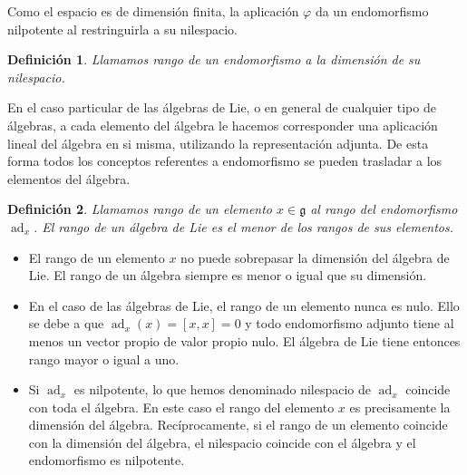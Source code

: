 \documentclass[a4paper,draft,12pt]{scrartcl}
\newtheorem{defi}{Definición}[section]%
\newcommand{\g}{\mathfrak{g}}%
\newcommand{\df}[1]{\textsf{\color{blue}#1}}
\DeclareMathOperator{\ad}{ad}  %
\begin{document}
Como el espacio es de dimensión finita, la aplicación $\varphi$ da un endomorfismo nilpotente al restringuirla a su nilespacio.

\begin{defi}

Llamamos  \df{rango} de un endomorfismo a la dimensión de su nilespacio.

\end{defi}

En el caso particular de las álgebras de Lie, o en general de cualquier tipo de álgebras, a cada elemento del álgebra le hacemos corresponder una aplicación lineal del álgebra en si misma, utilizando la representación adjunta.  De esta forma todos los conceptos referentes a endomorfismo se pueden trasladar a los elementos del álgebra.

\begin{defi}

Llamamos  \df{rango}  de un elemento $x \in \g$ al rango del endomorfismo $\ad_x$.  El  \df{rango} de un álgebra de Lie es el menor de los rangos de sus elementos.

\end{defi}



\begin{itemize}

\item  El rango de un elemento $x$ no puede sobrepasar la dimensión del álgebra de Lie.  El rango de un álgebra siempre es menor o igual que su dimensión.

\item  En el caso de las álgebras de Lie, el rango de un elemento nunca es nulo.  Ello se debe a que $\ad_x(x)= [x,x]=0$ y todo endomorfismo adjunto tiene al menos un vector propio de valor propio nulo.  El álgebra de Lie tiene entonces rango mayor o igual a uno.

\item  Si $\ad_x$ es nilpotente, lo que hemos denominado nilespacio de $\ad_x$ coincide con toda el álgebra.  En este caso el rango del elemento $x$ es precisamente la dimensión del álgebra.  Recíprocamente, si el rango de un elemento coincide con la dimensión del álgebra, el nilespacio coincide con el álgebra y el endomorfismo es nilpotente.



\end{itemize}
\end{document}
